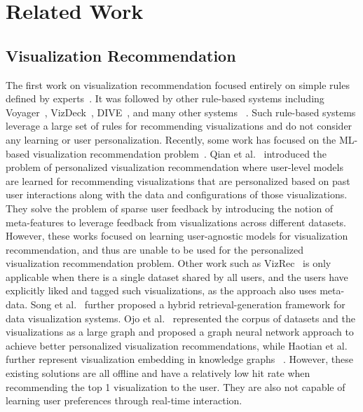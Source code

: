 
\section{Related Work} 
\subsection{Visualization Recommendation}
The first work on visualization recommendation focused entirely on simple rules defined by experts~\cite{mackinlay1986automating,feiner1985apex}.
It was followed by other rule-based systems including Voyager~\cite{vartak2017towards, wongsuphasawat2016voyager, wongsuphasawat2017voyager}, VizDeck~\cite{perry2013vizdeck}, DIVE~\cite{hu2018dive}, and many other systems ~\cite{choo2014visirr,gotz2009behavior}.
Such rule-based systems leverage a large set of rules for recommending visualizations and do not consider any learning or user personalization.
Recently, some work has focused on the ML-based visualization recommendation problem~\cite{ML-based-Vis-Rec,data2vis,demiralp2017foresight-vldb,kaur2015towards}. Qian et al.~\cite{qian_personalized_2021} introduced the problem of personalized visualization recommendation where user-level models are learned for recommending visualizations that are personalized based on past user interactions along with the data and configurations of those visualizations. They solve the problem of sparse user feedback by introducing the notion of meta-features to leverage feedback from visualizations across different datasets. However, these works focused on learning user-agnostic models for visualization recommendation, and thus are unable to be used for the personalized visualization recommendation problem. Other work such as VizRec~\cite{mutlu_vizrec_2016} is only applicable when there is a single dataset shared by all users, and the users have explicitly liked and tagged such visualizations, as the approach also uses meta-data.
Song et al.~\cite{song2022rgvisnet} further proposed a hybrid retrieval-generation framework for data visualization systems. 
Ojo et al.~\cite{ojo_visgnn_2022} represented the corpus of datasets and the visualizations as a large graph and proposed a graph neural network approach to achieve better personalized visualization recommendations, while Haotian et al. further represent visualization embedding in knowledge graphs ~\cite{li2021kg4vis}. However, these existing solutions are all offline and have a relatively low hit rate when recommending the top 1 visualization to the user. 
They are also not capable of learning user preferences through real-time interaction.


